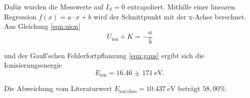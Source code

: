 Dafür wurden die Messwerte auf $I_S = 0$ extrapoliert.
Mithilfe einer linearen Regression $f(x) = a \cdot x + b$ wird der Schnittpunkt mit der x-Achse berechnet.
Aus Gleichung \eqref{eqn:uion}
\begin{equation}
  U_\text{ion} + K = -\frac{a}{b}
  \label{eqn:uion}
\end{equation}

und der Gauß'schen Fehlerfortpflanzung \eqref{eqn:gaus} ergibt sich die Ionisierungsenergie
\begin{equation*}
  E_\text{ion} = \SI{16,46(171)}{\eV}.
\end{equation*}

Die Abweichung vom Literaturwert $E_{\text{ion}, \text{theo}} = \SI{10,437}{\eV}$ \cite{sample3} beträgt $58,00 \%$.
